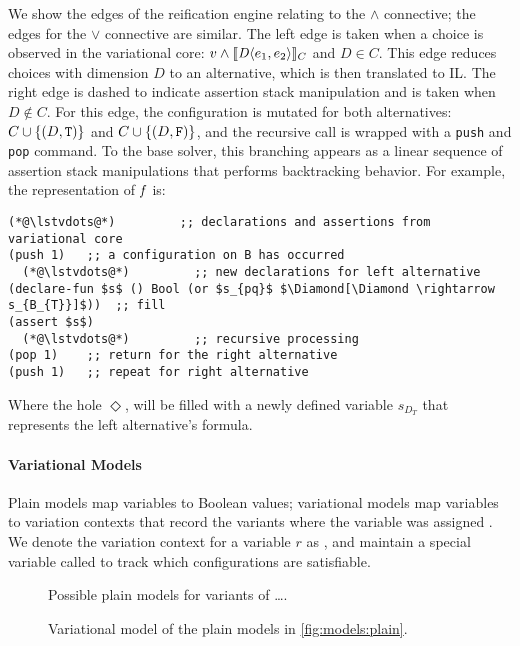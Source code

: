 We show the edges of the reification engine relating to the $\wedge$
connective; the edges for the $\vee$ connective are similar.
The left edge is taken when a choice is observed in
the variational core: $v \wedge \sem[C]{\chc[D]{e_{1}, e_{2}}}$ and $D \in C$.
This edge reduces choices with dimension $D$ to an alternative, which is then
translated to IL. The right edge is dashed to indicate assertion stack
manipulation and is taken when $D \notin C$. For this edge, the configuration
is mutated for both alternatives: $C \cup \{(D, \texttt{T}{})\}$ and $C \cup \{(D,
\texttt{F}{})\}$, and the recursive call is wrapped with a \texttt{push} and
\texttt{pop} command. To the base solver, this branching appears as a linear
sequence of assertion stack manipulations that performs backtracking behavior.
For example, the representation of $\mathit{f}$ is:
%
\begin{lstlisting}[columns=flexible,keepspaces=true]
  (*@\lstvdots@*)         ;; declarations and assertions from variational core
(push 1)   ;; a configuration on B has occurred
  (*@\lstvdots@*)         ;; new declarations for left alternative
(declare-fun $s$ () Bool (or $s_{pq}$ $\Diamond[\Diamond \rightarrow s_{B_{T}}]$))  ;; fill
(assert $s$)
  (*@\lstvdots@*)         ;; recursive processing
(pop 1)    ;; return for the right alternative
(push 1)   ;; repeat for right alternative
\end{lstlisting}
%
Where the hole $\Diamond$, will be filled with a newly defined variable
$s_{D_{T}}$ that represents the left alternative's formula.

\paragraph{Variational Models}%
\label{ssec:vmodels}
%
Plain models map variables to Boolean values; variational models map variables
to variation contexts that record the variants where the variable was assigned
\tru{}. We denote the variation context for a variable $r$ as , and
maintain a special variable called \SatVar{} to track which configurations are
satisfiable.

\begin{figure}
  
  \vspace{-2ex}
  \caption{Possible plain models for variants of \ldots{}.}%
  \label{fig:models:plain}
\end{figure}

\begin{figure}
  
  \caption{Variational model of the plain models in \autoref{fig:models:plain}.}%
  \label{fig:models:var}
\end{figure}


